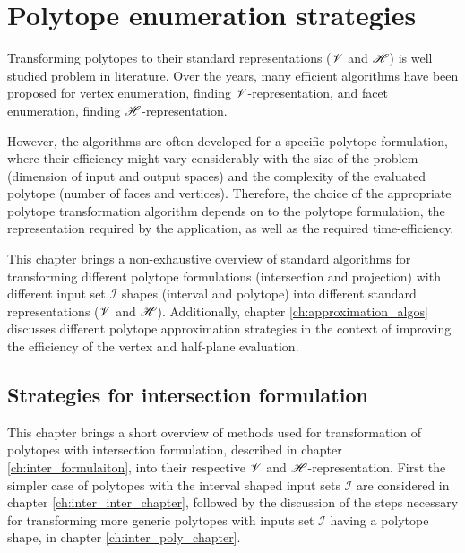 \section{Polytope enumeration strategies} 
\label{ch:polytope_algorithms}

Transforming polytopes to their standard representations ($\mathscr{V}$ and $\mathscr{H}$) is well studied problem in literature. Over the years, many efficient algorithms have been proposed for vertex enumeration, finding $\mathscr{V}$-representation, and facet enumeration, finding $\mathscr{H}$-representation\cite{bremner_fukuda_marzetta_1998,fukuda_dd,avis_pivoting_nodate}. 

However, the algorithms are often developed for a specific polytope formulation, where their efficiency might vary considerably with the size of the problem (dimension of input and output spaces)\cite{avis_comparative_2015} and the complexity of the evaluated polytope (number of faces and vertices)\cite{Dyer1983}. Therefore, the choice of the appropriate polytope transformation algorithm depends on to the polytope formulation, the representation required by the application, as well as the required time-efficiency.

This chapter brings a non-exhaustive overview of standard algorithms for transforming different polytope formulations (intersection and projection) with different input set $\mathcal{I}$ shapes (interval and polytope) into different standard representations ($\mathscr{V}$ and $\mathscr{H}$). Additionally, chapter \ref{ch:approximation_algos} discusses different polytope approximation strategies in the context of improving the efficiency of the vertex and half-plane evaluation.

\subsection{Strategies for intersection formulation}
\label{ch:intersection_algos}

This chapter brings a short overview of methods used for transformation of polytopes with intersection formulation, described in chapter \ref{ch:inter_formulaiton}, into their respective $\mathscr{V}$ and $\mathscr{H}$-representation. First the simpler case of polytopes with the interval shaped input sets $\mathcal{I}$ are considered in chapter \ref{ch:inter_inter_chapter}, followed by the discussion of the steps necessary for transforming more generic polytopes with inputs set $\mathcal{I}$ having a polytope shape, in chapter \ref{ch:inter_poly_chapter}.

